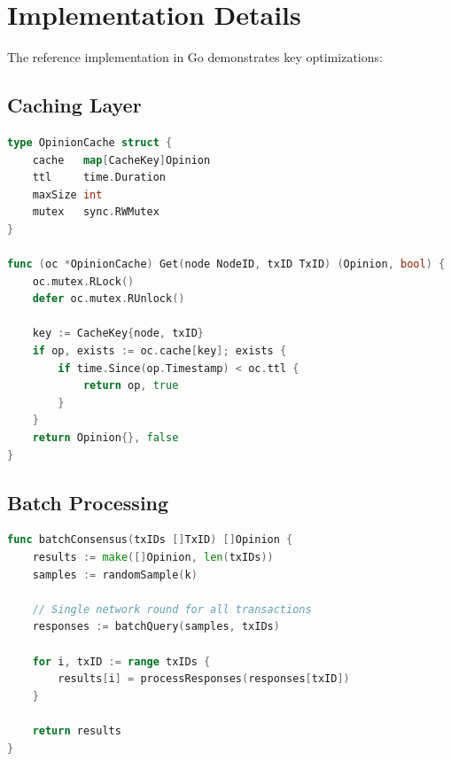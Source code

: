 \section{Implementation Details}

\label{sec:implementation}

The reference implementation in Go demonstrates key optimizations:

\subsection{Caching Layer}

\begin{lstlisting}[language=Go, caption=Opinion caching for performance]
type OpinionCache struct {
    cache   map[CacheKey]Opinion
    ttl     time.Duration
    maxSize int
    mutex   sync.RWMutex
}

func (oc *OpinionCache) Get(node NodeID, txID TxID) (Opinion, bool) {
    oc.mutex.RLock()
    defer oc.mutex.RUnlock()
    
    key := CacheKey{node, txID}
    if op, exists := oc.cache[key]; exists {
        if time.Since(op.Timestamp) < oc.ttl {
            return op, true
        }
    }
    return Opinion{}, false
}
\end{lstlisting}

\subsection{Batch Processing}

\begin{lstlisting}[language=Go, caption=Batch consensus for multiple transactions]
func batchConsensus(txIDs []TxID) []Opinion {
    results := make([]Opinion, len(txIDs))
    samples := randomSample(k)
    
    // Single network round for all transactions
    responses := batchQuery(samples, txIDs)
    
    for i, txID := range txIDs {
        results[i] = processResponses(responses[txID])
    }
    
    return results
}
\end{lstlisting}

